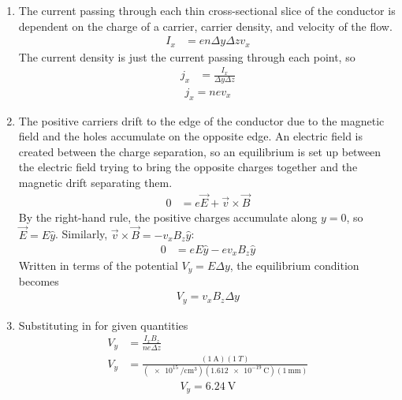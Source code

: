 \begin{enumerate}
	\item
		The current passing through each thin cross-sectional slice of the
		conductor is dependent on the charge of a carrier, carrier density,
		and velocity of the flow.
		\begin{align*}
			I_x &= en\Delta y\Delta zv_x
		\end{align*}
		The current density is just the current passing through each point, so
		\begin{align*}
			j_x &= \frac{I_x}{\Delta y\Delta z}
		\end{align*}
		\begin{align}
			\boxed{
			j_x = nev_x
			}
		\end{align}
	\item
		The positive carriers drift to the edge of the conductor due to the
		magnetic field and the holes accumulate on the opposite edge. An
		electric field is created between the charge separation, so an
		equilibrium is set up between the electric field trying to bring the
		opposite charges together and the magnetic drift separating them.
		\begin{align*}
			0 &= e\vec E + \vec v \times  \vec B
		\end{align*}
		By the right-hand rule, the positive charges accumulate along $y=0$, so
		$\vec E = E \hat y$. Similarly, $\vec v \times  \vec B = -v_xB_z\hat y$:
		\begin{align*}
			0 &= eE\hat y - ev_xB_z\hat y
		\end{align*}
		Written in terms of the potential $V_y = E\Delta y$, the equilibrium
		condition becomes
		\begin{align}
			\boxed{
			V_y = v_xB_z\Delta y
			}
		\end{align}
	\item
		Substituting in for given quantities
		\begin{align*}
			V_y &= \frac{I_x B_z}{ne\Delta z} \\
			V_y &= \frac{(\SI{1}{\A})(\SI{1}{T})}
				{(\SI[per-mode=reciprocal]{e15}{\per\cm\cubed})
				 (\SI{1.612e-19}{\coulomb})(\SI{1}{\mm})}
		\end{align*}
		\begin{align}
			\boxed{
			V_y = \SI{6.24}{\V}
			}
		\end{align}
\end{enumerate}
